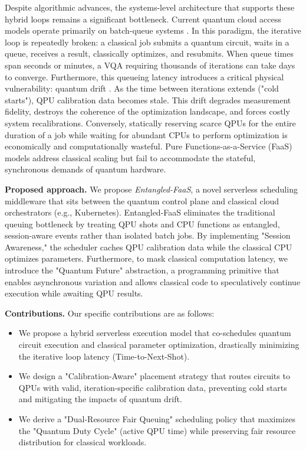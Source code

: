 \documentclass[conference]{IEEEtran}
\begin{document}
Despite algorithmic advances, the systems-level architecture that supports these hybrid loops remains a significant bottleneck. Current quantum cloud access models operate primarily on batch-queue systems \cite{qiskit_runtime_2022}. In this paradigm, the iterative loop is repeatedly broken: a classical job submits a quantum circuit, waits in a queue, receives a result, classically optimizes, and resubmits. When queue times span seconds or minutes, a VQA requiring thousands of iterations can take days to converge.
Furthermore, this queueing latency introduces a critical physical vulnerability: quantum drift \cite{drift_qce_2020}. As the time between iterations extends ("cold starts"), QPU calibration data becomes stale. This drift degrades measurement fidelity, destroys the coherence of the optimization landscape, and forces costly system recalibrations. Conversely, statically reserving scarce QPUs for the entire duration of a job while waiting for abundant CPUs to perform optimization is economically and computationally wasteful. Pure Functions-as-a-Service (FaaS) models address classical scaling but fail to accommodate the stateful, synchronous demands of quantum hardware.

\textbf{Proposed approach.} We propose \textit{Entangled-FaaS}, a novel serverless scheduling middleware that sits between the quantum control plane and classical cloud orchestrators (e.g., Kubernetes). Entangled-FaaS eliminates the traditional queuing bottleneck by treating QPU shots and CPU functions as entangled, session-aware events rather than isolated batch jobs. By implementing "Session Awareness," the scheduler caches QPU calibration data while the classical CPU optimizes parameters. Furthermore, to mask classical computation latency, we introduce the "Quantum Future" abstraction, a programming primitive that enables asynchronous variation and allows classical code to speculatively continue execution while awaiting QPU results.

\textbf{Contributions.} Our specific contributions are as follows:
\begin{itemize}
\item We propose a hybrid serverless execution model that co-schedules quantum circuit execution and classical parameter optimization, drastically minimizing the iterative loop latency (Time-to-Next-Shot).
\item We design a "Calibration-Aware" placement strategy that routes circuits to QPUs with valid, iteration-specific calibration data, preventing cold starts and mitigating the impacts of quantum drift.
\item We derive a "Dual-Resource Fair Queuing" scheduling policy that maximizes the "Quantum Duty Cycle" (active QPU time) while preserving fair resource distribution for classical workloads.
\end{itemize}
\end{document}
